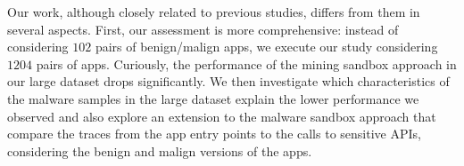 
Our work, although closely related to previous studies, differs from them in several aspects.  First, our assessment is more comprehensive: instead of considering $102$ pairs of benign/malign apps, we execute our study considering $1204$ pairs of apps. Curiously, the performance of the mining sandbox approach in our large dataset drops significantly. We then investigate which characteristics of the malware samples in the large dataset explain the lower performance we observed and also explore an extension to the malware sandbox approach that compare the traces from the app entry points to the calls to sensitive APIs, considering the benign and malign versions of the apps. 

